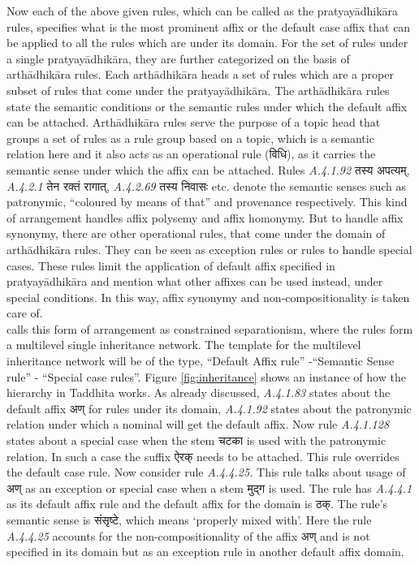 \documentclass[11pt]{article}
\begin{document}
Now each of the above given rules, which can be called as the pratyayādhikāra rules, specifies what is the most prominent affix or the default case affix that can be applied to all the rules which are under its domain. For the set of rules under a single pratyayādhikāra, they are further categorized on the basis of arthādhikāra rules. Each arthādhikāra heads a set of rules which are a proper subset of rules that come under the pratyayādhikāra. The arthādhikāra rules state the semantic conditions or the semantic rules under which the default affix can be attached. Arthādhikāra rules serve the purpose of a topic head that groups a set of rules as a rule group based on a topic, which is a semantic relation here and it also acts as an operational rule ({\skt विधि}), as it carries the semantic sense under which the affix can be attached. Rules {\sl A.4.1.92} {\skt तस्य अपत्यम्}, {\sl A.4.2.1} {\skt तेन रक्तं रागात्}, {\sl A.4.2.69} {\skt तस्य निवासः} etc. denote the semantic senses such as patronymic, ``coloured by means of that'' and provenance respectively. This kind of arrangement handles affix polysemy and affix homonymy. But to handle affix synonymy, there are other operational rules, that come under the domain of arthādhikāra rules. They can be seen as exception rules or rules to handle special cases. These rules limit the application of default affix specified in pratyayādhikāra and mention what other affixes can be used instead, under special conditions. In this way, affix synonymy and non-compositionality is taken care of.\\ 
 calls this form of arrangement as constrained separationism, where the rules form a multilevel single inheritance network. The template for the multilevel inheritance network will be of the type, ``Default Affix rule'' -``Semantic Sense rule'' - ``Special case rules''. Figure \ref{fig:inheritance} shows an instance of how the hierarchy in Taddhita works. As already discussed, {\sl A.4.1.83} states about the default affix {\skt अण्} for rules under its domain, {\sl A.4.1.92 }states about the patronymic relation under which a nominal will get the default affix. Now rule {\sl A.4.1.128} states about a special case when the stem {\skt चटका} is used with the patronymic relation. In such a case the suffix {\skt ऐरक्} needs to be attached. This rule overrides the default case rule. Now consider rule {\sl A.4.4.25.} This rule talks about usage of {\skt अण्} as an exception or special case when a stem {\skt मुद्ग} is used. The rule has {\sl A.4.4.1} as its default affix rule and the default affix for the domain is {\skt ठक्}. The rule's semantic sense is {\skt संसृष्टे}, which means `properly mixed with'. Here the rule {\sl A.4.4.25} accounts for the non-compositionality of the affix {\skt अण्} and is not specified in its domain but as an exception rule in another default affix domain.
\end{document}
